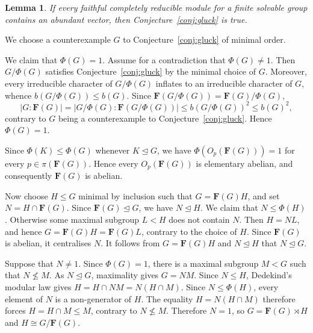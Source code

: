 \documentclass[10pt]{amsart}
\newtheorem{lemma}[theorem]{Lemma}
\theoremstyle{definition}
\renewcommand{\le}{\leqslant}
\renewcommand{\leq}{\leqslant}
\let\oldendproof\endproof
\renewenvironment{proof}[1][\proofname]{%
  \oldproof[\bfseries #1]%
}{\oldendproof}
\numberwithin{equation}{section}
\numberwithin{table}{section}
\begin{document}
\begin{lemma}\label{lem:reduction}
If every faithful completely reducible module for a finite solvable group contains
an abundant vector, then Conjecture~\ref{conj:gluck} is true.
\end{lemma}
\begin{proof}
We choose a counterexample $G$ to Conjecture~\ref{conj:gluck} of minimal order.

We claim that $\Phi(G)=1$. Assume for a contradiction that $\Phi(G)\neq1$.
Then $G/\Phi(G)$ satisfies Conjecture~\ref{conj:gluck} by the minimal choice of
$G$. Moreover, every irreducible character of $G/\Phi(G)$ inflates to an irreducible
character of $G$, whence $b(G/\Phi(G))\le b(G)$. Since
$\mathbf{F}(G/\Phi(G))=\mathbf{F}(G)/\Phi(G)$,
$$|G:\mathbf{F}(G)|=|G/\Phi(G):\mathbf{F}(G/\Phi(G))|\le b(G/\Phi(G))^2\le b(G)^2,$$
contrary to $G$ being a counterexample to Conjecture~\ref{conj:gluck}. Hence
$\Phi(G)=1$.

Since $\Phi(K)\le\Phi(G)$ whenever $K\trianglelefteq G$, we have
$\Phi(O_p(\mathbf{F}(G)))=1$ for every $p\in\pi(\mathbf{F}(G))$. Hence every
$O_p(\mathbf{F}(G))$ is elementary abelian, and consequently $\mathbf{F}(G)$
is abelian.

Now choose $H\le G$ minimal by inclusion such that $G=\mathbf{F}(G)H$, and set
$N=H\cap\mathbf{F}(G)$. Since $\mathbf{F}(G)\trianglelefteq G$, we have
$N\trianglelefteq H$. We claim that $N\le\Phi(H)$. Otherwise some maximal
subgroup $L<H$ does not contain $N$. Then $H=NL$, and hence
$G=\mathbf{F}(G)H=\mathbf{F}(G)L$, contrary to the choice of $H$. Since
$\mathbf{F}(G)$ is abelian, it centralises
$N$. It follows from $G=\mathbf{F}(G)H$ and $N\trianglelefteq H$ that
$N\trianglelefteq G$.

Suppose that $N\neq1$. Since $\Phi(G)=1$, there is a maximal subgroup $M<G$
such that $N\not\le M$. As $N\trianglelefteq G$, maximality gives $G=NM$.
Since $N\le H$, Dedekind's modular law gives $H=H\cap NM=N(H\cap M)$.
Since $N\leq\Phi(H)$, every element of $N$ is a non-generator of $H$. The equality $H=N(H\cap M)$ therefore forces $H=H\cap M\leq M$, contrary to $N\not\leq M$. Therefore $N=1$, so $G=\mathbf{F}(G)\rtimes H$ and
$H\cong G/\mathbf{F}(G)$.


\end{proof}
\end{document}
